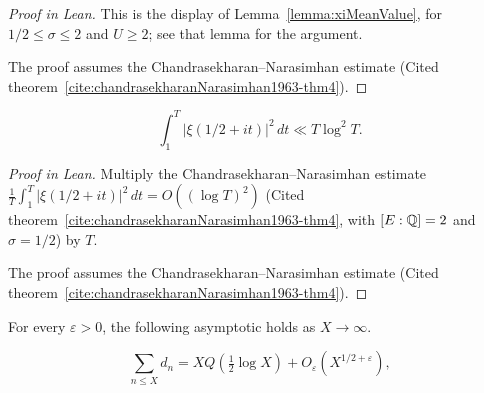 \begin{proof}[Proof in Lean]

\leanok


This is the display of Lemma~\ref{lemma:xiMeanValue}, for $1/2\leq\sigma\leq2$ and $U\geq2$; see that lemma for the argument.

The proof assumes the Chandrasekharan--Narasimhan estimate (Cited theorem~\ref{cite:chandrasekharanNarasimhan1963-thm4}).

\end{proof}

\begin{equationnode}

\label{eqn:criticalMeanSquare}


\leanok



\begin{equation*} \int_1^T|\xi(1/2+it)|^2\,dt \ll T\log^2T. \end{equation*}

\end{equationnode}

\begin{proof}[Proof in Lean]

\leanok


Multiply the Chandrasekharan--Narasimhan estimate $\frac1T\int_1^T|\xi(1/2+it)|^2\,dt=O((\log T)^2)$ (Cited theorem~\ref{cite:chandrasekharanNarasimhan1963-thm4}, with $[E:\mathbb{Q}]=2$ and $\sigma=1/2$) by $T$.

The proof assumes the Chandrasekharan--Narasimhan estimate (Cited theorem~\ref{cite:chandrasekharanNarasimhan1963-thm4}).

\end{proof}

\begin{equationnode}

\label{eqn:dSummatoryForGeneralTrace}


\leanok

For every $\varepsilon>0$, the following asymptotic holds as $X\to\infty$.

\begin{equation*} \sum_{n\leq X}d_n =XQ\left(\tfrac12\log X\right) +O_\varepsilon(X^{1/2+\varepsilon}), \end{equation*}

\end{equationnode}

